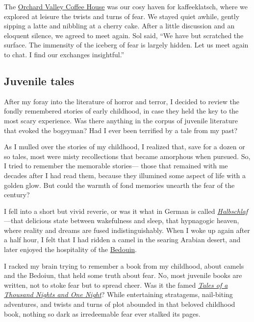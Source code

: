 \documentclass[
  a4paper,
]{article}
\begin{document}
The \href{http://www.orchardvalleycoffee.net/}{Orchard Valley Coffee
House} was our cosy haven for kaffeeklatsch, where we explored at
leisure the twists and turns of fear. We stayed quiet awhile, gently
sipping a latte and nibbling at a cherry cake. After a little discussion
and an eloquent silence, we agreed to meet again. Sol said, ``We have
but scratched the surface. The immensity of the iceberg of fear is
largely hidden. Let us meet again to chat. I find our exchanges
insightful.''

\hypertarget{juvenile-tales}{%
\subsection{Juvenile tales}\label{juvenile-tales}}

After my foray into the literature of horror and terror, I decided to
review the fondly remembered stories of early childhood, in case they
held the key to the most scary experience. Was there anything in the
corpus of juvenile literature that evoked the bogeyman? Had I ever been
terrified by a tale from my past?

As I mulled over the stories of my childhood, I realized that, save for
a dozen or so tales, most were misty recollections that became amorphous
when pursued. So, I tried to remember the memorable stories--- those
that remained with me decades after I had read them, because they
illumined some aspect of life with a golden glow. But could the warmth
of fond memories unearth the fear of the century?

I fell into a short but vivid reverie, or was it what in German is
called
\href{https://de.pons.com/\%C3\%BCbersetzung/deutsch-englisch/Halbschlaf}{\emph{Halbschlaf}}---that
delicious state between wakefulness and sleep, that hypnagogic heaven,
where reality and dreams are fused indistinguishably. When I woke up
again after a half hour, I felt that I had ridden a camel in the searing
Arabian desert, and later enjoyed the hospitality of the
\href{https://www.newworldencyclopedia.org/entry/Bedouin}{Bedouin}.

I racked my brain trying to remember a book from my childhood, about
camels and the Bedoiun, that held some truth about fear. No, most
juvenile books are written, not to stoke fear but to spread cheer. Was
it the famed
\href{https://www.newworldencyclopedia.org/entry/The_Book_of_One_Thousand_and_One_Nights}{\emph{Tales
of a Thousand Nights and One Night}}? While entertaining stratagems,
nail-biting adventures, and twists and turns of plot abounded in that
beloved childhood book, nothing so dark as irredeemable fear ever
stalked its pages.
\end{document}
